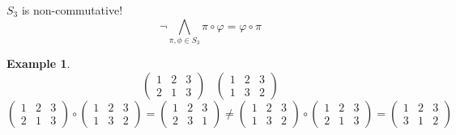 \documentclass[a4paper,landscape,twocolumn]{article}
\newtheorem{ex}{Example}[section]
\begin{document}
$S_3$ is non-commutative!
\[ \neg \bigwedge_{\pi, \phi \in S_3} \pi \circ \varphi = \varphi \circ \pi \]

\begin{ex}
  \[
    \begin{pmatrix} 1 & 2 & 3 \\ 2 & 1 & 3 \end{pmatrix}
    \hspace{10pt}
    \begin{pmatrix} 1 & 2 & 3 \\ 1 & 3 & 2 \end{pmatrix}
  \]
  \[
    \begin{pmatrix} 1 & 2 & 3 \\ 2 & 1 & 3 \end{pmatrix}
      \circ \begin{pmatrix} 1 & 2 & 3 \\ 1 & 3 & 2 \end{pmatrix}
      = \begin{pmatrix} 1 & 2 & 3 \\ 2 & 3 & 1 \end{pmatrix}
      \neq \begin{pmatrix} 1 & 2 & 3 \\ 1 & 3 & 2 \end{pmatrix}
      \circ \begin{pmatrix} 1 & 2 & 3 \\ 2 & 1 & 3 \end{pmatrix}
      = \begin{pmatrix} 1 & 2 & 3 \\ 3 & 1 & 2 \end{pmatrix}
  \]
\end{ex}
\end{document}
